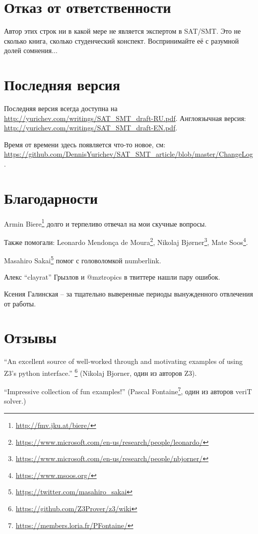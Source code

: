 \section{Отказ от ответственности}

Автор этих строк ни в какой мере не является экспертом в SAT/SMT.
Это не сколько книга, сколько студенческий конспект.
Воспринимайте её с разумной долей сомнения...

\section{Последняя версия}

Последняя версия всегда доступна на \url{http://yurichev.com/writings/SAT_SMT_draft-RU.pdf}.
Англоязычная версия: \url{http://yurichev.com/writings/SAT_SMT_draft-EN.pdf}.

Время от времени здесь появляется что-то новое, см: \url{https://github.com/DennisYurichev/SAT_SMT_article/blob/master/ChangeLog}.

\section{Благодарности}

Armin Biere\footnote{\url{http://fmv.jku.at/biere/}} долго и терпеливо отвечал на мои скучные вопросы.

Также помогали:
Leonardo Mendonça de Moura\footnote{\url{https://www.microsoft.com/en-us/research/people/leonardo/}},
Nikolaj Bjørner\footnote{\url{https://www.microsoft.com/en-us/research/people/nbjorner/}},
Mate Soos\footnote{\url{https://www.msoos.org/}}.

Masahiro Sakai\footnote{\url{https://twitter.com/masahiro_sakai}} помог с головоломкой numberlink.

Алекс ``clayrat'' Грызлов и @mztropics в твиттере нашли пару ошибок.

Ксения Галинская -- за тщательно выверенные периоды вынужденного отвлечения от работы.

\section{Отзывы}

``An excellent source of well-worked through and motivating examples of using Z3's python interface.''
\footnote{\url{https://github.com/Z3Prover/z3/wiki}}
(Nikolaj Bjorner, один из авторов Z3).

``Impressive collection of fun examples!''
(Pascal Fontaine\footnote{\url{https://members.loria.fr/PFontaine/}}, один из авторов veriT solver.)

